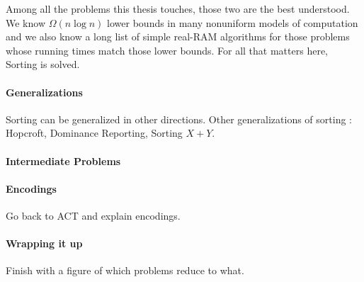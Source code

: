Among all the problems this thesis touches, those two are the best understood.
We know \(\Omega(n \log n)\) lower bounds in many nonuniform models of
computation and we also know a long list of simple real-RAM algorithms for
those problems whose running times match those lower bounds. For all that
matters here, Sorting is solved.


\paragraph{Generalizations}
Sorting can be generalized in other directions.
Other generalizations of sorting : Hopcroft, Dominance Reporting, Sorting \(X+Y\).

\paragraph{Intermediate Problems}

\paragraph{Encodings}
Go back to ACT and explain encodings.

\paragraph{Wrapping it up}

Finish with a figure of which problems reduce to what.
